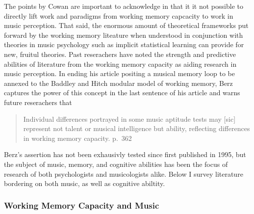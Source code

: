 \documentclass[]{book}
\begin{document}
The points by Cowan are important to acknowledge in that it it not possible to directly lift work and paradigms from working memory capcacity to work in music perception.
That said, the enormous amount of theoretical frameworks put forward by the working memory liteature when understood in conjunction with theories in music psychology such as implicit statistical learning \citep{saffranStatisticalLearningTone1999} can provide for new, fruitul theories.
Past reserachers have noted the strength and predictive abilities of literature from the working memory capacity as aiding research in music perception.
In ending his article positing a musical memory loop to be annexed to the Baddley and Hitch modular model of working memory, Berz \citep{berzWorkingMemoryMusic1995} captures the power of this concept in the last sentence of his article and warns future reserachers that

\begin{quote}
Individual differences portrayed in some music aptitude tests may {[}sic{]} represent not talent or musical intelligence but ability, reflecting differences in working memory capacity. p.~362
\end{quote}

Berz's assertion has not been exhausivly tested since first published in 1995, but the subject of music, memory, and cognitive abilities has been the focus of research of both psychologists and musicologists alike.
Below I survey literature bordering on both music, as well as cognitive abiltity.

\hypertarget{working-memory-capacity-and-music}{%
\subsubsection{Working Memory Capacity and Music}\label{working-memory-capacity-and-music}}
\end{document}
